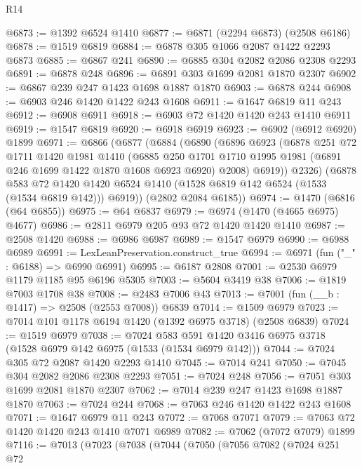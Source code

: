 \begin{lexlean}{R14}
\begin{coremodule}
@6873 := @1392 @6524 @1410
@6877 := @6871 (@2294 @6873) (@2508 @6186)
@6878 := @1519 @6819
@6884 := @6878 @305 @1066 @2087 @1422 @2293 @6873
@6885 := @6867 @241
@6890 := @6885 @304 @2082 @2086 @2308 @2293
@6891 := @6878 @248
@6896 := @6891 @303 @1699 @2081 @1870 @2307
@6902 := @6867 @239 @247 @1423 @1698 @1887 @1870
@6903 := @6878 @244
@6908 := @6903 @246 @1420 @1422 @243 @1608
@6911 := @1647 @6819 @11 @243
@6912 := @6908 @6911
@6918 := @6903 @72 @1420 @1420 @243 @1410 @6911
@6919 := @1547 @6819
@6920 := @6918 @6919
@6923 := @6902 (@6912 @6920) @1899
@6971 := @6866
    (@6877
      (@6884
        (@6890
          (@6896
            @6923
            (@6878
              @251
              @72
              @1711
              @1420
              @1981
              @1410
              (@6885
                @250
                @1701
                @1710
                @1995
                @1981
                (@6891 @246 @1699 @1422 @1870 @1608 @6923 @6920)
                @2008)
              @6919))
          @2326)
        (@6878
          @583
          @72
          @1420
          @1420
          @6524
          @1410
          (@1528 @6819 @142 @6524 (@1533 (@1534 @6819 @142)))
          @6919))
      (@2802 @2084 @6185))
@6974 := @1470 (@6816 (@64 @6855))
@6975 := @64 @6837
@6979 := @6974 (@1470 (@4665 @6975) @4677)
@6986 := @2811 @6979 @205 @93 @72 @1420 @1420 @1410
@6987 := @2508 @1420
@6988 := @6986 @6987
@6989 := @1547 @6979
@6990 := @6988 @6989
@6991 := LexLeanPreservation.construct_true
@6994 := @6971 (fun ("_" : @6188) => @6990 @6991)
@6995 := @6187 @2808
@7001 := @2530 @6979 @1179 @1185 @95 @6196 @5305
@7003 := @5604 @3419 @38
@7006 := @1819 @7003 @1708 @38
@7008 := @2483 @7006 @43
@7013 := @7001 (fun (__b : @1417) => @2508 (@2553 @7008)) @6839
@7014 := @1509 @6979
@7023 := @7014 @101 @1178 @6194 @1420 (@1392 @6975 @3718) (@2508 @6839)
@7024 := @1519 @6979
@7038 := @7024 @583 @591 @1420 @3416 @6975 @3718 (@1528 @6979 @142 @6975 (@1533 (@1534 @6979 @142)))
@7044 := @7024 @305 @72 @2087 @1420 @2293 @1410
@7045 := @7014 @241
@7050 := @7045 @304 @2082 @2086 @2308 @2293
@7051 := @7024 @248
@7056 := @7051 @303 @1699 @2081 @1870 @2307
@7062 := @7014 @239 @247 @1423 @1698 @1887 @1870
@7063 := @7024 @244
@7068 := @7063 @246 @1420 @1422 @243 @1608
@7071 := @1647 @6979 @11 @243
@7072 := @7068 @7071
@7079 := @7063 @72 @1420 @1420 @243 @1410 @7071 @6989
@7082 := @7062 (@7072 @7079) @1899
@7116 := @7013
    (@7023
      (@7038
        (@7044
          (@7050
            (@7056
              @7082
              (@7024
                @251
                @72

\end{coremodule}
\end{lexlean}
